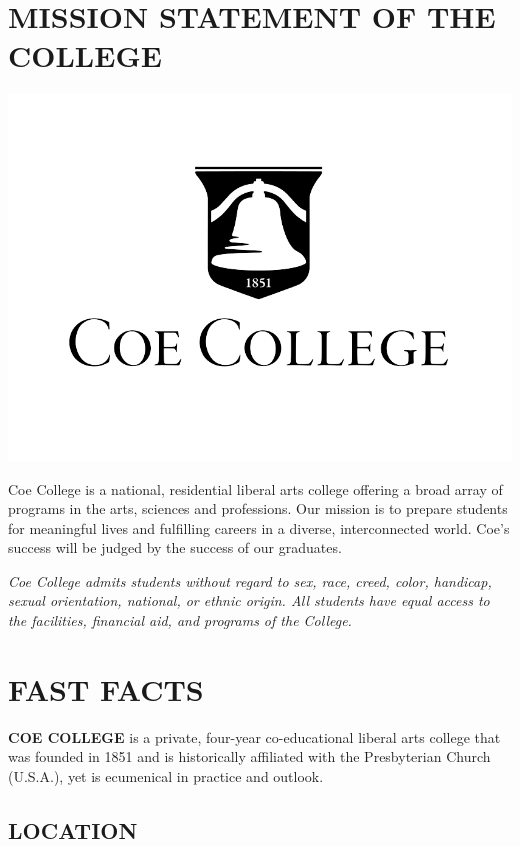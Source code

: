 \documentclass[
  letterpaper,
]{scrbook}
\begin{document}
\chapter{MISSION STATEMENT OF THE
COLLEGE}\label{sec-mission-statement-of-college}

\begin{center}
\includegraphics{catalog_sections/graphics/coe_bell.png}
\end{center}


Coe College is a national, residential liberal arts college offering a
broad array of programs in the arts, sciences and professions. Our
mission is to prepare students for meaningful lives and fulfilling
careers in a diverse, interconnected world. Coe's success will be judged
by the success of our graduates.

\emph{Coe College admits students without regard to sex, race, creed,
color, handicap, sexual orientation, national, or ethnic origin. All
students have equal access to the facilities, financial aid, and
programs of the College.}

\chapter{FAST FACTS}\label{sec-fast-facts}

\textbf{COE COLLEGE} is a private, four-year co-educational liberal arts
college that was founded in 1851 and is historically affiliated with the
Presbyterian Church (U.S.A.), yet is ecumenical in practice and outlook.

\section{LOCATION}\label{location}
\end{document}
